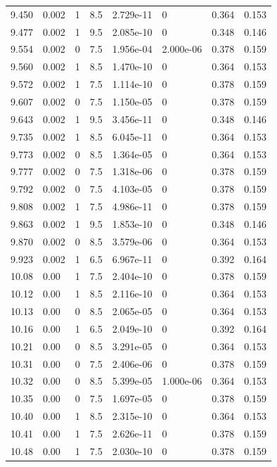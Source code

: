 \documentclass[preview]{standalone}
\begin{document}
{{{{{{{\begin{tabular}{L{1.2cm}C{1.2cm} C{0.3cm}C{0.5cm} C{1.4cm}C{1.4cm} C{1.4cm}C{1.4cm}}
  9.450  &  0.002  & 1     & 8.5 &  2.729e-11  & 0  & 0.364 &  0.153   \\ 
  9.477  &  0.002  & 1     & 9.5 &  2.085e-10  & 0  & 0.348 &  0.146   \\ 
  9.554  &  0.002  & 0     & 7.5 &  1.956e-04  & 2.000e-06  & 0.378 &  0.159   \\ 
  9.560  &  0.002  & 1     & 8.5 &  1.470e-10  & 0  & 0.364 &  0.153   \\ 
  9.572  &  0.002  & 1     & 7.5 &  1.114e-10  & 0  & 0.378 &  0.159   \\ 
  9.607  &  0.002  & 0     & 7.5 &  1.150e-05  & 0  & 0.378 &  0.159   \\ 
  9.643  &  0.002  & 1     & 9.5 &  3.456e-11  & 0  & 0.348 &  0.146   \\ 
  9.735  &  0.002  & 1     & 8.5 &  6.045e-11  & 0  & 0.364 &  0.153   \\ 
  9.773  &  0.002  & 0     & 8.5 &  1.364e-05  & 0  & 0.364 &  0.153   \\ 
  9.777  &  0.002  & 0     & 7.5 &  1.318e-06  & 0  & 0.378 &  0.159   \\ 
  9.792  &  0.002  & 0     & 7.5 &  4.103e-05  & 0  & 0.378 &  0.159   \\ 
  9.808  &  0.002  & 1     & 7.5 &  4.986e-11  & 0  & 0.378 &  0.159   \\ 
  9.863  &  0.002  & 1     & 9.5 &  1.853e-10  & 0  & 0.348 &  0.146   \\ 
  9.870  &  0.002  & 0     & 8.5 &  3.579e-06  & 0  & 0.364 &  0.153   \\ 
  9.923  &  0.002  & 1     & 6.5 &  6.967e-11  & 0  & 0.392 &  0.164   \\ 
  10.08  &  0.00  & 1     & 7.5 &  2.404e-10  & 0  & 0.378 &  0.159   \\ 
  10.12  &  0.00  & 1     & 8.5 &  2.116e-10  & 0  & 0.364 &  0.153   \\ 
  10.13  &  0.00  & 0     & 8.5 &  2.065e-05  & 0  & 0.364 &  0.153   \\ 
  10.16  &  0.00  & 1     & 6.5 &  2.049e-10  & 0  & 0.392 &  0.164   \\ 
  10.21  &  0.00  & 0     & 8.5 &  3.291e-05  & 0  & 0.364 &  0.153   \\ 
  10.31  &  0.00  & 0     & 7.5 &  2.406e-06  & 0  & 0.378 &  0.159   \\ 
  10.32  &  0.00  & 0     & 8.5 &  5.399e-05  & 1.000e-06  & 0.364 &  0.153   \\ 
  10.35  &  0.00  & 0     & 7.5 &  1.697e-05  & 0  & 0.378 &  0.159   \\ 
  10.40  &  0.00  & 1     & 8.5 &  2.315e-10  & 0  & 0.364 &  0.153   \\ 
  10.41  &  0.00  & 1     & 7.5 &  2.626e-11  & 0  & 0.378 &  0.159   \\ 
  10.48  &  0.00  & 1     & 7.5 &  2.030e-10  & 0  & 0.378 &  0.159   \\ 
\hline 
\end{tabular} 

}}}}}}}
\end{document}
